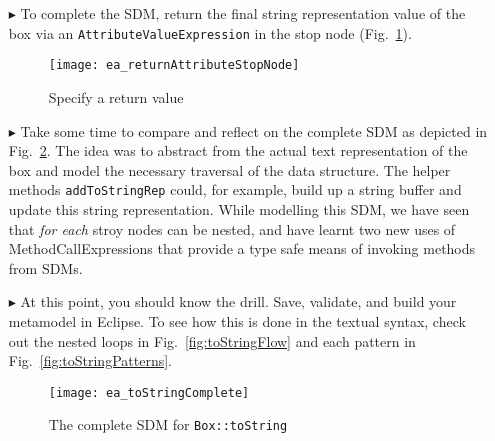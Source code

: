 \begin{itemize}

\item[$\blacktriangleright$] To complete the SDM, return the final string representation value of the box via an \texttt{AttributeValueExpression} in
the stop node (Fig.~\ref{fig:toStringStopNode}).

\vspace{0.5cm}

\begin{figure}[htbp]
\begin{center}
  \texttt{[image: ea\_returnAttributeStopNode]}
  \caption{Specify a return value}
  \label{fig:toStringStopNode}
\end{center}
\end{figure}

\vspace{0.5cm}

\item[$\blacktriangleright$] Take some time to compare and reflect on the complete SDM as depicted in Fig.~\ref{fig:sdm_tostring_5}.  The idea was to abstract
from the actual text representation of the box and model the necessary traversal of the data structure. The helper methods \texttt{addToStringRep} could, for example, build up a
string buffer and update this string representation. While modelling this SDM, we have seen that \emph{for each} stroy nodes can be nested, and have learnt two
new uses of MethodCallExpressions that provide a type safe means of invoking methods from SDMs.

\vspace{0.5cm}

\item[$\blacktriangleright$] At this point, you should know the drill. Save, validate, and build your metamodel in Eclipse. To see how this is done in the
textual syntax, check out the nested loops in Fig.~\ref{fig:toStringFlow} and each pattern in Fig.~\ref{fig:toStringPatterns}.

\newpage

\vspace*{2cm}

\begin{figure}[htbp]
\begin{center}
  \texttt{[image: ea\_toStringComplete]}
  \caption{The complete SDM for \texttt{Box::toString}}  
  \label{fig:sdm_tostring_5}
\end{center}
\end{figure}
\FloatBarrier


\end{itemize}
